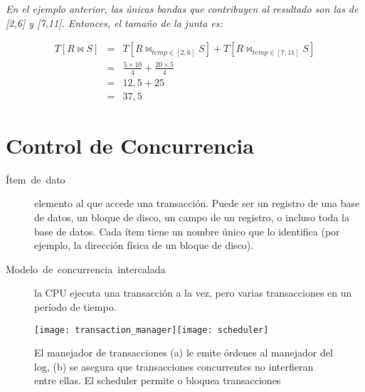 \documentclass[a4paper, twoside]{article}
\begin{document}
\emph{En el ejemplo anterior, las únicas bandas que contribuyen al
resultado son las de {[}2,6{]} y {[}7,11{]}. Entonces, el tamaño de
la junta es:}

\emph{
\begin{eqnarray*}
T\left[R\bowtie S\right] & = & T\left[R\bowtie_{temp\in[2,6]}S\right]+T\left[R\bowtie_{temp\in[7,11]}S\right]\\
 & = & \frac{5\times10}{4}+\frac{20\times5}{4}\\
 & = & 12,5+25\\
 & = & 37,5
\end{eqnarray*}
}

\pagebreak{}


\part{Control de Concurrencia}
\begin{description}
\item [{Ítem~de~dato}] elemento al que accede una transacción. Puede
ser un registro de una base de datos, un bloque de disco, un campo
de un registro, o incluso toda la base de datos. Cada ítem tiene un
nombre único que lo identifica (por ejemplo, la dirección física de
un bloque de disco). 
\item [{Modelo~de~concurrencia~intercalada}] la CPU ejecuta una transacción
a la vez, pero varias transacciones en un período de tiempo.
\end{description}
\begin{figure}[H]
\noindent \begin{centering}
\texttt{[image: transaction\_manager]}\texttt{[image: scheduler]}
\par\end{centering}

\protect\caption{El manejador de transacciones (a) le emite órdenes al manejador del
log, (b) se asegura que transacciones concurrentes no interfieran
entre ellas. El scheduler permite o bloquea transacciones}
\end{figure}
\end{document}
